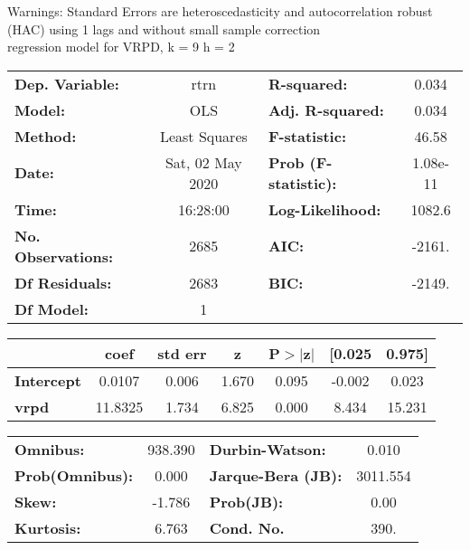 Warnings: \newline
 [1] Standard Errors are heteroscedasticity and autocorrelation robust (HAC) using 1 lags and without small sample correction\\ 

regression model for VRPD, k = 9 h = 2\begin{center}
\begin{tabular}{lclc}
\toprule
\textbf{Dep. Variable:}    &       rtrn       & \textbf{  R-squared:         } &     0.034   \\
\textbf{Model:}            &       OLS        & \textbf{  Adj. R-squared:    } &     0.034   \\
\textbf{Method:}           &  Least Squares   & \textbf{  F-statistic:       } &     46.58   \\
\textbf{Date:}             & Sat, 02 May 2020 & \textbf{  Prob (F-statistic):} &  1.08e-11   \\
\textbf{Time:}             &     16:28:00     & \textbf{  Log-Likelihood:    } &    1082.6   \\
\textbf{No. Observations:} &        2685      & \textbf{  AIC:               } &    -2161.   \\
\textbf{Df Residuals:}     &        2683      & \textbf{  BIC:               } &    -2149.   \\
\textbf{Df Model:}         &           1      & \textbf{                     } &             \\
\bottomrule
\end{tabular}
\begin{tabular}{lcccccc}
                   & \textbf{coef} & \textbf{std err} & \textbf{z} & \textbf{P$> |$z$|$} & \textbf{[0.025} & \textbf{0.975]}  \\
\midrule
\textbf{Intercept} &       0.0107  &        0.006     &     1.670  &         0.095        &       -0.002    &        0.023     \\
\textbf{vrpd}      &      11.8325  &        1.734     &     6.825  &         0.000        &        8.434    &       15.231     \\
\bottomrule
\end{tabular}
\begin{tabular}{lclc}
\textbf{Omnibus:}       & 938.390 & \textbf{  Durbin-Watson:     } &    0.010  \\
\textbf{Prob(Omnibus):} &   0.000 & \textbf{  Jarque-Bera (JB):  } & 3011.554  \\
\textbf{Skew:}          &  -1.786 & \textbf{  Prob(JB):          } &     0.00  \\
\textbf{Kurtosis:}      &   6.763 & \textbf{  Cond. No.          } &     390.  \\
\bottomrule
\end{tabular}
\end{center}

